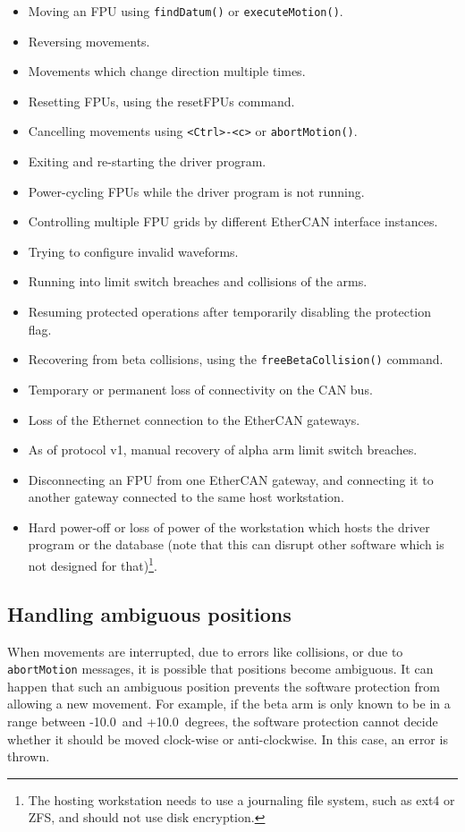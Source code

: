\documentclass[11pt,a4paper]{scrartcl}
\begin{document}
\begin{itemize}
\item Moving an FPU using \texttt{findDatum()} or \texttt{executeMotion()}.
\item Reversing movements.
\item Movements which change direction multiple times.
\item Resetting FPUs, using the resetFPUs command.
\item Cancelling movements using \verb+<Ctrl>-<c>+ or \texttt{abortMotion()}.
\item Exiting and re-starting the driver program.
\item Power-cycling FPUs while the driver program is not running.
\item Controlling multiple FPU grids by different EtherCAN interface instances.
\item Trying to configure invalid waveforms.
\item Running into limit switch breaches and collisions of the arms.
\item Resuming protected operations after temporarily disabling the
  protection flag.
\item Recovering from beta collisions, using the
  \texttt{freeBetaCollision()} command.
\item Temporary or permanent loss of connectivity on the CAN bus.
\item Loss of the Ethernet connection to the EtherCAN gateways.
\item As of protocol v1, manual recovery of alpha arm limit switch
  breaches.
\item Disconnecting an FPU from one EtherCAN gateway, and connecting
  it to another gateway connected to the same host workstation. 
\item Hard power-off or loss of power of the workstation which hosts
  the driver program or the database (note that this can disrupt other
  software which is not designed for that)\footnote{The hosting
    workstation needs to use a journaling file system, such as ext4 or
    ZFS, and should not use disk encryption.}.
\end{itemize}

\subsection{Handling ambiguous positions}
%
When movements are interrupted, due to errors like
collisions, or due to \texttt{abortMotion} messages, it is possible
that positions become ambiguous. It can happen that such an ambiguous
position prevents the software protection from allowing a new
movement.  For example, if the beta arm is only known to be in a range
between -10.0\degree\ and +10.0\degree\ degrees, the software protection cannot decide
whether it should be moved clock-wise or anti-clockwise. In this case,
an error is thrown.
\end{document}
